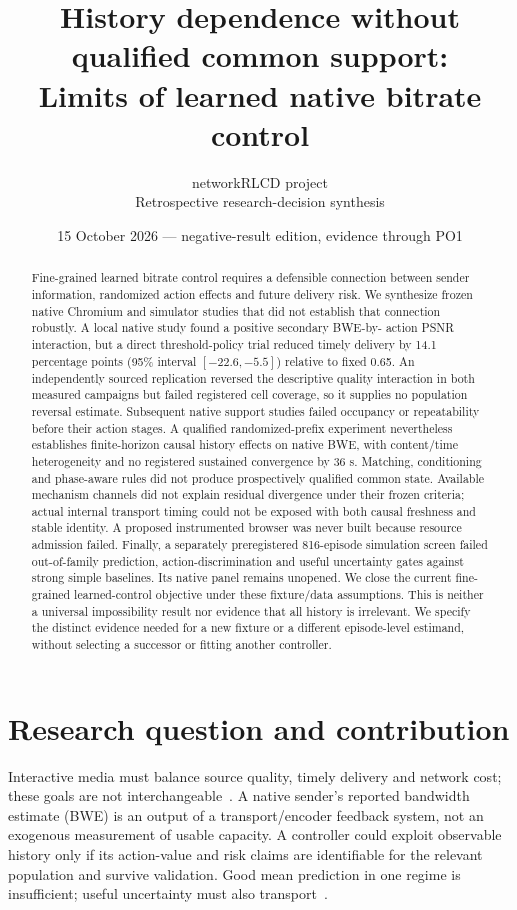 \documentclass[10pt]{article}
\title{History dependence without qualified common support:\\
Limits of learned native bitrate control}
\author{networkRLCD project\\Retrospective research-decision synthesis}
\date{15 October 2026 --- negative-result edition, evidence through PO1}
\begin{document}
\maketitle

\begin{abstract}
Fine-grained learned bitrate control requires a defensible connection between
sender information, randomized action effects and future delivery risk. We
synthesize frozen native Chromium and simulator studies that did not establish
that connection robustly. A local native study found a positive secondary BWE-by-
action PSNR interaction, but a direct threshold-policy trial reduced timely
delivery by 14.1 percentage points (95\% interval $[-22.6,-5.5]$) relative to
fixed 0.65. An independently sourced replication reversed the descriptive quality
interaction in both measured campaigns but failed registered cell coverage, so
it supplies no population reversal estimate. Subsequent native support studies
failed occupancy or repeatability before their action stages. A qualified
randomized-prefix experiment nevertheless establishes finite-horizon causal
history effects on native BWE, with content/time heterogeneity and no registered
sustained convergence by 36 s. Matching, conditioning and phase-aware rules did
not produce prospectively qualified common state. Available mechanism channels
did not explain residual divergence under their frozen criteria; actual internal
transport timing could not be exposed with both causal freshness and stable
identity. A proposed instrumented browser was never built because resource
admission failed. Finally, a separately preregistered 816-episode simulation
screen failed out-of-family prediction, action-discrimination and useful
uncertainty gates against strong simple baselines. Its native panel remains
unopened. We close the current fine-grained learned-control objective under
these fixture/data assumptions. This is neither a universal impossibility
result nor evidence that all history is irrelevant. We specify the distinct
evidence needed for a new fixture or a different episode-level estimand,
without selecting a successor or fitting another controller.
\end{abstract}

\section{Research question and contribution}
Interactive media must balance source quality, timely delivery and network cost;
these goals are not interchangeable~\cite{rfc8836}. A native sender's reported
bandwidth estimate (BWE) is an output of a transport/encoder feedback system,
not an exogenous measurement of usable capacity. A controller could exploit
observable history only if its action-value and risk claims are identifiable
for the relevant population and survive validation. Good mean prediction in one
regime is insufficient; useful uncertainty must also transport~\cite{ovadia}.
\end{document}
